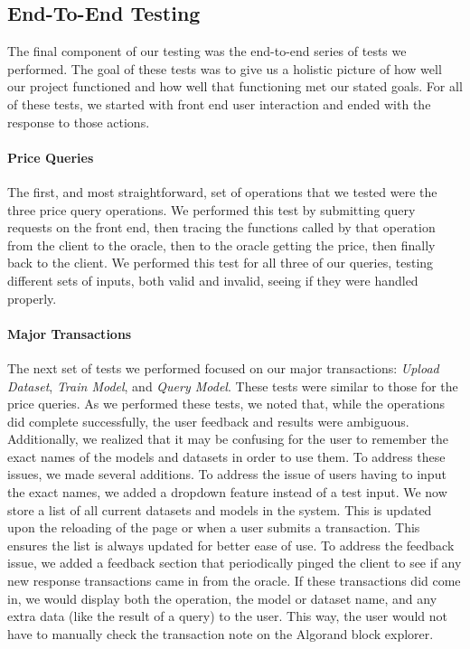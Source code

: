 \documentclass{ledger}
\begin{document}
\subsection{End-To-End Testing}

The final component of our testing was the end-to-end series of tests we performed.  The goal of these tests was to
give us a holistic picture of how well our project functioned and how well that functioning met our stated goals.
For all of these tests, we started with front end user interaction and ended with the response to those actions.

\paragraph{Price Queries}
The first, and most straightforward, set of operations that we tested were the three price query operations.
We performed this test by submitting query requests on the front end, then tracing the functions called by that operation
from the client to the oracle, then to the oracle getting the price, then finally back to the client.  We performed
this test for all three of our queries, testing different sets of inputs, both valid and invalid, seeing if they
were handled properly.

\paragraph{Major Transactions}
The next set of tests we performed focused on our major transactions: \textit{Upload Dataset}, \textit{Train Model},
and \textit{Query Model}.  These tests were similar to those for the price queries.  As we performed these tests, we
noted that, while the operations did complete successfully, the user feedback and results were ambiguous.  Additionally,
we realized that it may be confusing for the user to remember the exact names of the models and datasets in order to
use them.  To address these issues, we made several additions.  To address the issue of users having to input the
exact names, we added a dropdown feature instead of a test input.  We now store a list of all current datasets and
models in the system.  This is updated upon the reloading of the page or when a user submits a transaction.  This
ensures the list is always updated for better ease of use.  To address the feedback issue, we added a feedback section
that periodically pinged the client to see if any new response transactions came in from the oracle.  If these
transactions did come in, we would display both the operation, the model or dataset name, and any extra data (like
the result of a query) to the user.  This way, the user would not have to manually check the transaction note on
the Algorand block explorer.
\end{document}
